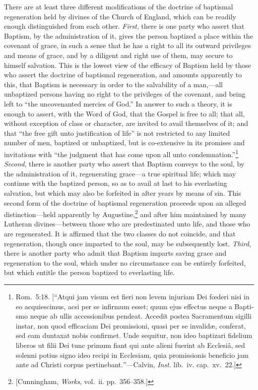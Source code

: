 \documentclass[
  english,
]{book}
\providecommand{\textlatin}{}
\renewcommand{\textlatin}[2][]{\foreignlanguage{latin}{#2}}
\begin{document}
There are at least three different modifications of the doctrine of baptismal regeneration held by divines of the Church of England, which can be readily enough distinguished from each other. \emph{First}, there is one party who assert that Baptism, by the administration of it, gives the person baptized a place within the covenant of grace, in such a sense that he has a right to all its outward privileges and means of grace, and by a diligent and right use of them, may secure to himself salvation. This is the lowest view of the efficacy of Baptism held by those who assert the doctrine of baptismal regeneration, and amounts apparently to this, that Baptism is necessary in order to the salvability of a man,---all unbaptized persons having no right to the privileges of the covenant, and being left to ``the uncovenanted mercies of God.'' In answer to such a theory, it is enough to assert, with the Word of God, that the Gospel is free to all; that all, without exception of class or character, are invited to avail themselves of it; and that ``the free gift unto justification of life'' is not restricted to any limited number of men, baptized or unbaptized, but is co-extensive in its promises and invitations with ``the judgment that has come upon all unto condemnation.''\footnote{Rom.~5:18. {[}``\textlatin{Atqui jam visum est fieri non levem injuriam Dei fœderi nisi in eo acquiescimus, acsi per se infirmum esset; quum ejus effectus neque a Baptismo neque ab ullis accessionibus pendeat. Accedit postea Sacramentum sigilli instar, non quod efficaciam Dei promissioni, quasi per se invalidæ, conferat, sed eam duntaxat nobis confirmet. Unde sequitur, non ideo baptizari fidelium liberos ut filii Dei tunc primum fiant qui ante alieni fuerint ab Ecclesiâ, sed solenni potius signo ideo recipi in Ecclesiam, quia promissionis beneficio jam ante ad Christi corpus pertinebant.}''---Calvin, \emph{Inst.} lib.~iv. cap.~xv.~22.{]}} \emph{Second}, there is another party who assert that Baptism conveys to the soul, by the administration of it, regenerating grace---a true spiritual life; which may continue with the baptized person, so as to avail at last to his everlasting salvation, but which may also be forfeited in after years by means of sin. This second form of the doctrine of baptismal regeneration proceeds upon an alleged distinction---held apparently by Augustine,\footnote{{[}Cunningham, \emph{Works}, vol.~ii. pp.~356--358.{]}} and after him maintained by many Lutheran divines---between those who are predestinated unto life, and those who are regenerated. It is affirmed that the two classes do not coincide, and that regeneration, though once imparted to the soul, may be subsequently lost. \emph{Third}, there is another party who admit that Baptism imparts saving grace and regeneration to the soul, which under no circumstance can be entirely forfeited, but which entitle the person baptized to everlasting life.
\end{document}
